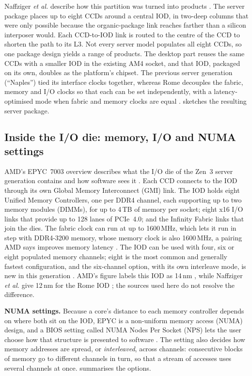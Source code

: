 Naffziger \emph{et al.} describe how this partition was turned into products \cite{naffziger2020chiplet}. The server package places up to eight CCDs around a central IOD, in two-deep columns that were only possible because the organic-package link reaches farther than a silicon interposer would. Each CCD-to-IOD link is routed to the centre of the CCD to shorten the path to its L3. Not every server model populates all eight CCDs, so one package design yields a range of products. The desktop part reuses the same CCDs with a smaller IOD in the existing AM4 socket, and that IOD, packaged on its own, doubles as the platform's chipset. The previous server generation (``Naples'') tied its interface clocks together, whereas Rome decouples the fabric, memory and I/O clocks so that each can be set independently, with a latency-optimised mode when fabric and memory clocks are equal \cite{naffziger2020chiplet}.  sketches the resulting server package.



\subsection{Inside the I/O die: memory, I/O and NUMA settings}
\label{sec:iod-detail}
AMD's EPYC~7003 overview describes what the I/O die of the Zen~3 server generation contains and how software sees it \cite{amd2022epyc7003}. Each CCD connects to the IOD through its own Global Memory Interconnect (GMI) link. The IOD holds eight Unified Memory Controllers, one per DDR4 channel, each supporting up to two memory modules (DIMMs), for up to 4\,TB of memory per socket; eight x16 I/O links that provide up to 128 lanes of PCIe~4.0; and the Infinity Fabric links that join the dies. The fabric clock can run at up to 1600\,MHz, which lets it run in step with DDR4-3200 memory, whose memory clock is also 1600\,MHz, a pairing AMD says improves memory latency \cite{amd2022epyc7003}. The IOD can be used with four, six or eight populated memory channels; eight is the most common and generally fastest configuration, and the six-channel option, with its own interleave mode, is new in this generation \cite{amd2022epyc7003}. AMD's figure labels this IOD as 14\,nm \cite[Fig.~2-4]{amd2022epyc7003}, while Naffziger \emph{et al.} give 12\,nm for the Rome IOD \cite{naffziger2020chiplet}; the sources used here do not resolve the difference.

\textbf{NUMA settings.} Because a core's distance to each memory controller depends on where both sit on the IOD, EPYC is a non-uniform memory access (NUMA) design, and a BIOS setting called NUMA Nodes Per Socket (NPS) lets the user choose how that structure is presented to software \cite{amd2022epyc7003}. The setting also decides how memory addresses are spread, or \emph{interleaved}, across channels: consecutive blocks of memory go to different channels in turn, so that a stream of accesses uses several channels at once.  summarises the options.

